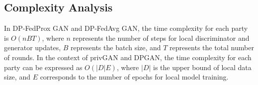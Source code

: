 \documentclass[conference]{IEEEtran}
\begin{document}
\subsection{Complexity Analysis}


In DP-FedProx GAN and DP-FedAvg GAN, the time complexity for each party is $O(nBT)$, where $n$ represents the number of steps for local discriminator and generator updates, $B$ represents the batch size, and $T$ represents the total number of rounds.  In the context of privGAN and DPGAN, the time complexity for each party can be expressed as $O(|D|E)$, where  $|D|$ is the upper bound of local data size, and $E$ corresponds to the number of epochs for local model training.

\end{document}
